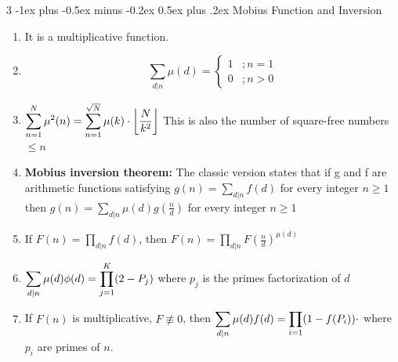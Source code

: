 \documentclass[8pt,a4paper,onesided]{article}
\makeatletter
\renewcommand{\subsection}{\@startsection{subsection}{2}{0mm}
    {-1ex plus -0.5ex minus -0.2ex} %
    {0.5ex plus .2ex}                %
    {\normalfont\large\bfseries}}    %
\makeatother
\begin{document}
\begin{multicols}{3}
\subsection{Mobius Function and Inversion}
\begin{enumerate}[resume]
    \item It is a multiplicative function.
    \item \[\sum_{d|n}\mu(d) =
    \begin{cases}
      1 & ; n=1\\
      0 & ; n > 0
    \end{cases}\]
    \item $\displaystyle \displaystyle \sum\limits_{n=1}^N {\mu}^2(n) = \displaystyle \sum\limits_{n=1}^{\sqrt{N}} \mu(k) \cdot \left \lfloor \dfrac{N}{k^2} \right\rfloor$
    This is also the number of square-free numbers $\displaystyle \le n$
    \item \textbf{Mobius inversion theorem:} The classic version states that if g and f are arithmetic functions satisfying
    $g(n) = \displaystyle \sum_{d|n}f(d) $ for every integer $n \ge 1$ then $g(n) = \displaystyle \sum_{d|n}\mu(d)g\left(\frac{n}{d}\right)$ for every integer $n \ge 1$
    \item If $\displaystyle F(n) = \displaystyle \prod_{d|n} f(d)$, then $\displaystyle F(n) = \displaystyle \prod_{d|n} F\left(\frac{n}{d}\right)^{\mu(d)}$
    \item $\displaystyle \displaystyle \sum_{d|n}\mu(d)\phi(d) = \displaystyle \prod_{j=1}^K (2 - P_j)$
    where $\displaystyle p_j$ is the primes factorization of $d$
    \item If $\displaystyle F(n)$ is multiplicative, $\displaystyle F \not\equiv 0$, then $\displaystyle \displaystyle \sum_{d|n} \mu(d) f(d) = \displaystyle \prod_{i=1} (1 - f(P_i)) \cdot$
    where $\displaystyle p_i$ are primes of $n$.
\end{enumerate}

\end{multicols}
\end{document}
